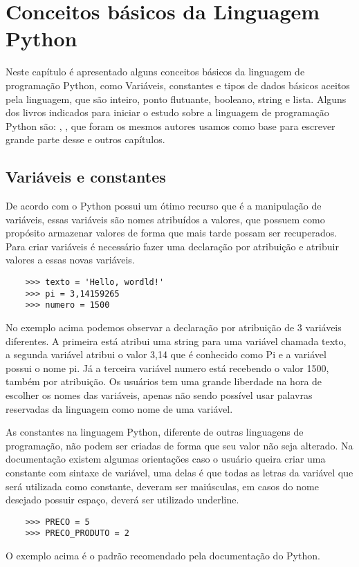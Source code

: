 

\chapter{ Conceitos básicos da Linguagem Python}

Neste capítulo é apresentado alguns conceitos básicos da linguagem de programação Python, como Variáveis, constantes e tipos de dados básicos aceitos pela linguagem, que são inteiro, ponto flutuante, booleano, string e lista. Alguns dos livros indicados para iniciar o estudo sobre a linguagem de programação Python são:  \cite{Lutz2007}, \cite{Perkovic2016}, que foram os mesmos autores usamos como base para escrever grande parte desse e outros capítulos.

    \section{Variáveis e constantes}
	De acordo com \cite{Severance2016} o Python possui um ótimo recurso que é a manipulação de variáveis, essas variáveis são nomes atribuídos a valores, que possuem como propósito armazenar valores de forma que mais tarde possam ser recuperados. 
	Para criar variáveis é necessário fazer uma declaração por atribuição e atribuir valores a essas novas variáveis. 
	\begin{lstlisting}
	>>> texto = 'Hello, wordld!'
	>>> pi = 3,14159265
	>>> numero = 1500
	\end{lstlisting}
	No exemplo acima podemos observar a declaração por atribuição de 3 variáveis diferentes. A primeira está atribui uma string para uma variável chamada texto, a segunda variável atribui o valor 3,14 que é conhecido como Pi e a variável possui o nome pi. Já a terceira variável numero está recebendo o valor 1500, também por atribuição. Os usuários tem uma grande liberdade na hora de escolher os nomes das variáveis, apenas não sendo possível usar palavras reservadas da linguagem como nome de uma variável.
	
	As constantes na linguagem Python, diferente de outras linguagens de programação, não podem ser criadas de forma que seu valor não seja alterado. Na documentação existem algumas orientações caso o usuário queira criar uma constante com sintaxe de variável, uma delas é que todas as letras da variável que será utilizada como constante, deveram ser maiúsculas, em casos do nome desejado possuir espaço, deverá ser utilizado underline.
	\begin{lstlisting}
	>>> PRECO = 5
	>>> PRECO_PRODUTO = 2
	\end{lstlisting}
	O exemplo acima é o padrão recomendado pela documentação do Python.

